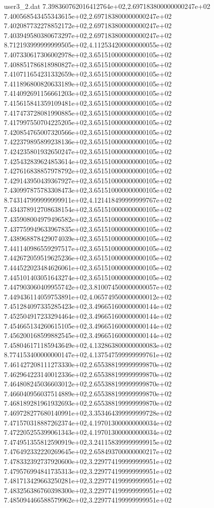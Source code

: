 \begin{filecontents}{user3_2.dat}
7.398360762016412764e+02,2.697183800000000247e+02
7.400568543455343615e+02,2.697183800000000247e+02
7.402087732278852172e+02,2.697183800000000247e+02
7.403949580380673297e+02,2.697183800000000247e+02
8.712193999999999505e+02,4.112534200000000055e+02
7.407330617306002978e+02,3.651510000000000105e+02
7.408851786818980827e+02,3.651510000000000105e+02
7.410711654231332659e+02,3.651510000000000105e+02
7.411896800820633189e+02,3.651510000000000105e+02
7.414092691156661203e+02,3.651510000000000105e+02
7.415615841359109481e+02,3.651510000000000105e+02
7.417473728081990885e+02,3.651510000000000105e+02
7.417997550704225205e+02,3.651510000000000105e+02
7.420854765007320566e+02,3.651510000000000105e+02
7.422379895899238136e+02,3.651510000000000105e+02
7.424235801932650247e+02,3.651510000000000105e+02
7.425432839624853614e+02,3.651510000000000105e+02
7.427616838857978792e+02,3.651510000000000105e+02
7.429143950439367927e+02,3.651510000000000105e+02
7.430997875783308473e+02,3.651510000000000105e+02
8.743147999999999911e+02,4.121418499999999767e+02
7.434378912708638154e+02,3.651510000000000105e+02
7.435908004979496582e+02,3.651510000000000105e+02
7.437759949633967835e+02,3.651510000000000105e+02
7.438968878429074039e+02,3.651510000000000105e+02
7.441140986559297517e+02,3.651510000000000105e+02
7.442672059519625236e+02,3.651510000000000105e+02
7.444522023484626061e+02,3.651510000000000105e+02
7.445101403051643274e+02,3.651510000000000105e+02
7.447903060409955742e+02,3.810074500000000057e+02
7.449436114059753891e+02,4.065749500000000012e+02
7.451284097335285423e+02,3.496651600000000144e+02
7.452504917233294464e+02,3.496651600000000144e+02
7.454665134260615105e+02,3.496651600000000144e+02
7.456200168599882545e+02,3.496651600000000144e+02
7.458046171185943649e+02,4.132863800000000083e+02
8.774153400000000147e+02,4.137547599999999761e+02
7.461427208111273330e+02,2.655388199999999870e+02
7.462964223140012336e+02,2.655388199999999870e+02
7.464808245036603012e+02,2.655388199999999870e+02
7.466040956037514889e+02,2.655388199999999870e+02
7.468189281961932693e+02,2.655388199999999870e+02
7.469728277680140991e+02,3.353464399999999728e+02
7.471570318887262374e+02,4.197013000000000034e+02
7.472205255399061343e+02,4.197013000000000034e+02
7.474951355812590919e+02,3.241158399999999915e+02
7.476492332220269645e+02,2.658493700000000217e+02
7.478332392737920600e+02,3.229774199999999951e+02
7.479576994841735313e+02,3.229774199999999951e+02
7.481713429663250281e+02,3.229774199999999951e+02
7.483256386760398300e+02,3.229774199999999951e+02
7.485094466588579962e+02,3.229774199999999951e+02

\end{filecontents}
